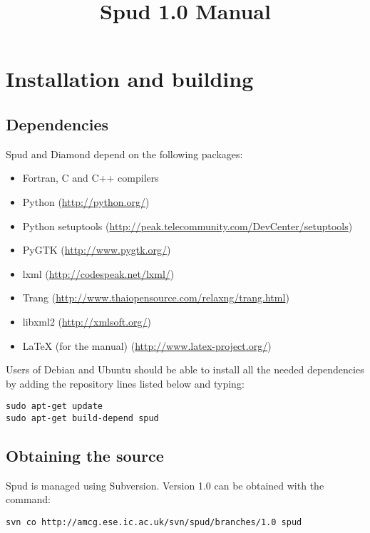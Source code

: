 \documentclass[a4paper, 11pt]{book}
\title{Spud 1.0 Manual}
\begin{document}
\maketitle

\tableofcontents


\chapter{Installation and building}

\section{Dependencies}

Spud and Diamond depend on the following packages:

\begin{itemize}
\item Fortran, C and C++ compilers
\item Python (\url{http://python.org/})
\item Python setuptools (\url{http://peak.telecommunity.com/DevCenter/setuptools})
\item PyGTK (\url{http://www.pygtk.org/})
\item lxml (\url{http://codespeak.net/lxml/})
\item Trang (\url{http://www.thaiopensource.com/relaxng/trang.html})
\item libxml2 (\url{http://xmlsoft.org/})
\item LaTeX (for the manual) (\url{http://www.latex-project.org/})
\end{itemize}

Users of Debian and Ubuntu should
be able to install all the needed dependencies by adding the repository
lines listed below and typing:

\begin{verbatim}
sudo apt-get update
sudo apt-get build-depend spud
\end{verbatim}

\section{Obtaining the source}

Spud is managed using Subversion. Version 1.0 can be obtained with the
command:

\begin{verbatim}
svn co http://amcg.ese.ic.ac.uk/svn/spud/branches/1.0 spud
\end{verbatim}
\end{document}
